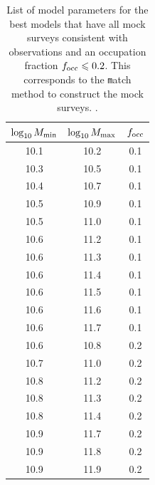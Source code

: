 \documentclass[usenatbib]{mn2e}
\begin{document}
\begin{table}
\begin{center}
\begin{tabular}{ccc}\hline\hline
$\log_{10}M_{\rm min}$ & $\log_{10}M_{\rm max}$ & $f_{\rm occ}$\\\hline
10.1& 10.2& 0.1\\
10.3& 10.5& 0.1\\
10.4& 10.7& 0.1\\
10.5& 10.9& 0.1\\
10.5& 11.0& 0.1\\
10.6& 11.2& 0.1\\
10.6& 11.3& 0.1\\
10.6& 11.4& 0.1\\
10.6& 11.5& 0.1\\
10.6& 11.6& 0.1\\
10.6& 11.7& 0.1\\
10.6& 10.8& 0.2\\
10.7& 11.0& 0.2\\
10.8& 11.2& 0.2\\
10.8& 11.3& 0.2\\
10.8& 11.4& 0.2\\
10.9& 11.7& 0.2\\
10.9& 11.8& 0.2\\
10.9& 11.9& 0.2\\
\end{tabular}
\end{center}
\caption{List of model parameters for the best models that have all
  mock surveys consistent with observations and an occupation
  fraction $f_{\rm occ}\leq 0.2$. This corresponds to the {\texttt
    match} method to construct the mock surveys. \label{table:models_match}. }
\end{table}


 
\end{document}
